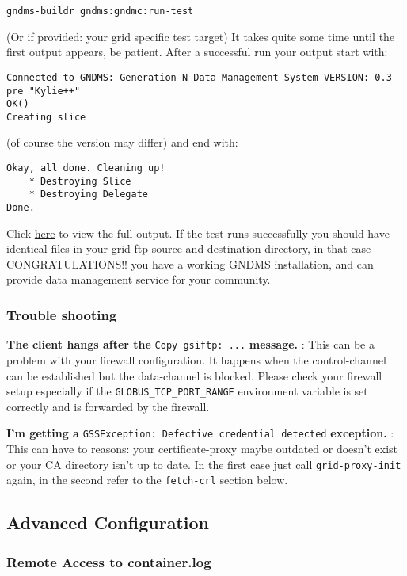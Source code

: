 \documentclass{article}
\begin{document}
\begin{verbatim}
gndms-buildr gndms:gndmc:run-test
\end{verbatim}
(Or if provided: your grid specific test target) It takes quite
some time until the first output appears, be patient. After a
successful run your output start with:

\begin{verbatim}
Connected to GNDMS: Generation N Data Management System VERSION: 0.3-pre "Kylie++"
OK()
Creating slice
\end{verbatim}
(of course the version may differ) and end with:

\begin{verbatim}
Okay, all done. Cleaning up!
    * Destroying Slice
    * Destroying Delegate
Done.
\end{verbatim}
Click \href{test-output.txt}{here} to view the full output. If the
test runs successfully you should have identical files in your
grid-ftp source and destination directory, in that case
CONGRATULATIONS!! you have a working GNDMS installation, and can
provide data management service for your community.

\subsubsection{Trouble shooting}

\textbf{The client hangs after the }\verb|Copy gsiftp: ...|\textbf{ message.}
: This can be a problem with your firewall configuration. It
happens when the control-channel can be established but the
data-channel is blocked. Please check your firewall setup
especially if the \verb!GLOBUS_TCP_PORT_RANGE! environment variable
is set correctly and is forwarded by the firewall.

\textbf{I'm getting a }\verb|GSSException: Defective credential detected|\textbf{ exception.}
: This can have to reasons: your certificate-proxy maybe outdated
or doesn't exist or your CA directory isn't up to date. In the
first case just call \verb!grid-proxy-init! again, in the second
refer to the \verb!fetch-crl! section below.

\subsection{Advanced Configuration}

\subsubsection{Remote Access to container.log}
\end{document}
